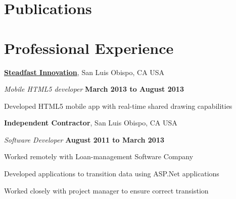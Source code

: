 \documentclass[10pt]{article}
\begin{document}
\section{Publications}

\begin{publications}

\end{publications}




\section{Professional Experience}

\href{http://steadfastinnovation.com/}{\textbf{Steadfast Innovation}},
San Luis Obispo, CA USA
\begin{outerlist}
\item[] \textit{Mobile HTML5 developer}%
    \hfill \textbf{March 2013 to August 2013}%
    \begin{innerlist}
    \item Developed HTML5 mobile app with real-time shared drawing capabilities 
    \end{innerlist}
\end{outerlist}

\halfblankline


{\textbf{Independent Contractor}}, San Luis Obispo, CA USA
\begin{outerlist}
\item[] \textit{Software Developer}%
    \hfill \textbf{August 2011 to March 2013}
    \begin{innerlist}%
    \item Worked remotely with Loan-management Software Company
    \item Developed applications to transition data using ASP.Net applications
    \item Worked closely with project manager to ensure correct transistion
\end{innerlist}

\end{outerlist}
\end{document}
